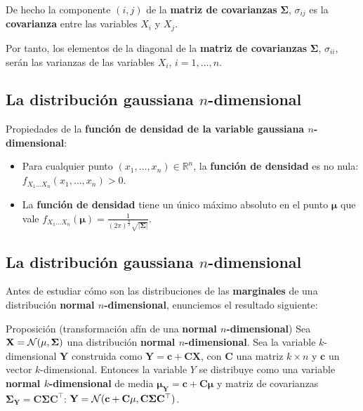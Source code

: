 \documentclass[]{book}
\begin{document}
De hecho la componente \((i,j)\) de la \textbf{matriz de covarianzas} \(\mathbf{\Sigma}\), \(\sigma_{ij}\) es la \textbf{covarianza} entre las variables \(X_i\) y \(X_j\).

Por tanto, los elementos de la diagonal de la \textbf{matriz de covarianzas} \(\mathbf{\Sigma}\), \(\sigma_{ii}\), serán las varianzas de las variables \(X_i\), \(i=1,\ldots,n\).

\hypertarget{la-distribuciuxf3n-gaussiana-n-dimensional-2}{%
\subsection{\texorpdfstring{La distribución gaussiana \(n\)-dimensional}{La distribución gaussiana n-dimensional}}\label{la-distribuciuxf3n-gaussiana-n-dimensional-2}}

Propiedades de la \textbf{función de densidad de la variable gaussiana \(n\)-dimensional}:

\begin{itemize}
\item
  Para cualquier punto \((x_1,\ldots,x_n)\in\mathbb{R}^n\), la \textbf{función de densidad} es no nula: \(f_{X_1\ldots X_n}(x_1,\ldots,x_n)>0\).
\item
  La \textbf{función de densidad} tiene un único máximo absoluto en el punto \(\mathbf{\mu}\) que vale \(f_{X_1\ldots X_n}(\mathbf{\mu})=\frac{1}{(2\pi)^{\frac{n}{2}}\sqrt{\mathbf{|\Sigma|}}}\).
\end{itemize}

\hypertarget{la-distribuciuxf3n-gaussiana-n-dimensional-3}{%
\subsection{\texorpdfstring{La distribución gaussiana \(n\)-dimensional}{La distribución gaussiana n-dimensional}}\label{la-distribuciuxf3n-gaussiana-n-dimensional-3}}

Antes de estudiar cómo son las distribuciones de las \textbf{marginales} de una distribución \textbf{normal \(n\)-dimensional}, enunciemos el resultado siguiente:

Proposición (transformación afín de una \textbf{normal \(n\)-dimensional})
Sea \(\mathbf{X}={\cal N}(\mathbf{\mu},\mathbf{\Sigma})\) una distribución \textbf{normal \(n\)-dimensional}. Sea la variable \(k\)-dimensional \(\mathbf{Y}\) construida como \(\mathbf{Y}=\mathbf{c}+\mathbf{C}\mathbf{X}\), con \(\mathbf{C}\) una matriz \(k\times n\) y \(\mathbf{c}\) un vector \(k\)-dimensional. Entonces la variable \(Y\) se distribuye como una variable \textbf{normal \(k\)-dimensional} de media \(\mathbf{\mu}_{\mathbf{Y}}=\mathbf{c}+\mathbf{C}\mathbf{\mu}\) y matriz de covarianzas \(\mathbf{\Sigma}_{\mathbf{Y}}=\mathbf{C}\mathbf{\Sigma}\mathbf{C}^\top\): \(\mathbf{Y}={\cal N}(\mathbf{c}+\mathbf{C}\mathbf{\mu},\mathbf{C}\mathbf{\Sigma}\mathbf{C}^\top)\).
\end{document}
